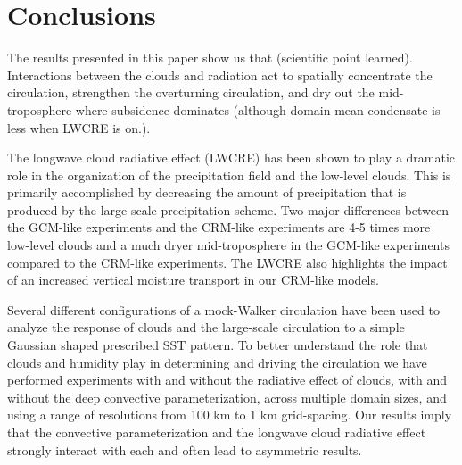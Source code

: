 \documentclass[11pt]{article}   	%
\begin{document}
%


\section{Conclusions}

The results presented in this paper show us that (scientific point learned).    Interactions between the clouds and radiation
act to spatially concentrate the circulation, strengthen the overturning circulation, and dry out the mid-troposphere where 
subsidence dominates (although domain mean condensate is less when LWCRE is on.).  

The longwave cloud radiative effect (LWCRE) has been shown to play a dramatic role in the organization of the precipitation
field and the low-level clouds.  This is primarily accomplished by decreasing the amount of precipitation that is produced 
by the large-scale precipitation scheme.  Two major differences between the GCM-like experiments and the CRM-like 
experiments are 4-5 times more low-level clouds and a much dryer mid-troposphere in the GCM-like experiments compared 
to the CRM-like experiments.  The LWCRE also highlights the impact of an increased vertical moisture transport 
in our CRM-like models.  

Several different configurations of a mock-Walker circulation have been used to analyze the response of clouds and the 
large-scale circulation to a simple Gaussian shaped prescribed SST pattern.  To better understand the role that clouds
and humidity play in determining and driving the circulation we have performed experiments with and without the radiative
effect of clouds, with and without the deep convective parameterization, across multiple domain sizes,  
and using a range of resolutions from 100 km to 1 km grid-spacing.  Our results imply that the convective 
parameterization and the longwave cloud radiative effect strongly interact with each and often lead to 
asymmetric results.   
\end{document}
